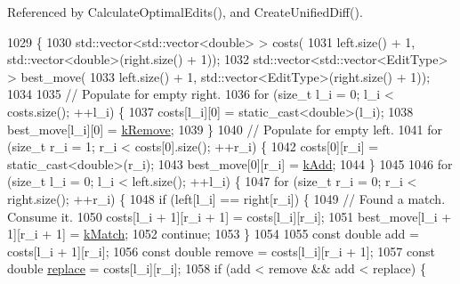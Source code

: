 Referenced by Calculate\+Optimal\+Edits(), and Create\+Unified\+Diff().


\begin{DoxyCode}
1029                                                                             \{
1030   std::vector<std::vector<double> > costs(
1031       left.size() + 1, std::vector<double>(right.size() + 1));
1032   std::vector<std::vector<EditType> > best\_move(
1033       left.size() + 1, std::vector<EditType>(right.size() + 1));
1034 
1035   \textcolor{comment}{// Populate for empty right.}
1036   \textcolor{keywordflow}{for} (\textcolor{keywordtype}{size\_t} l\_i = 0; l\_i < costs.size(); ++l\_i) \{
1037     costs[l\_i][0] = \textcolor{keyword}{static\_cast<}\textcolor{keywordtype}{double}\textcolor{keyword}{>}(l\_i);
1038     best\_move[l\_i][0] = \hyperlink{namespacetesting_1_1internal_1_1edit__distance_ad46aa6da12aec1a3f166310478b53a08a814768ef6cd0264a0a10b1e701a63e78}{kRemove};
1039   \}
1040   \textcolor{comment}{// Populate for empty left.}
1041   \textcolor{keywordflow}{for} (\textcolor{keywordtype}{size\_t} r\_i = 1; r\_i < costs[0].size(); ++r\_i) \{
1042     costs[0][r\_i] = \textcolor{keyword}{static\_cast<}\textcolor{keywordtype}{double}\textcolor{keyword}{>}(r\_i);
1043     best\_move[0][r\_i] = \hyperlink{namespacetesting_1_1internal_1_1edit__distance_ad46aa6da12aec1a3f166310478b53a08a63400b073f5b311a87d568b5ae27ffe8}{kAdd};
1044   \}
1045 
1046   \textcolor{keywordflow}{for} (\textcolor{keywordtype}{size\_t} l\_i = 0; l\_i < left.size(); ++l\_i) \{
1047     \textcolor{keywordflow}{for} (\textcolor{keywordtype}{size\_t} r\_i = 0; r\_i < right.size(); ++r\_i) \{
1048       \textcolor{keywordflow}{if} (left[l\_i] == right[r\_i]) \{
1049         \textcolor{comment}{// Found a match. Consume it.}
1050         costs[l\_i + 1][r\_i + 1] = costs[l\_i][r\_i];
1051         best\_move[l\_i + 1][r\_i + 1] = \hyperlink{namespacetesting_1_1internal_1_1edit__distance_ad46aa6da12aec1a3f166310478b53a08a7bdb9c74613a94f21b7489e0b5640a63}{kMatch};
1052         \textcolor{keywordflow}{continue};
1053       \}
1054 
1055       \textcolor{keyword}{const} \textcolor{keywordtype}{double} add = costs[l\_i + 1][r\_i];
1056       \textcolor{keyword}{const} \textcolor{keywordtype}{double} \textcolor{keyword}{remove} = costs[l\_i][r\_i + 1];
1057       \textcolor{keyword}{const} \textcolor{keywordtype}{double} \hyperlink{namespacesmacc_1_1introspection_a48571b9bf3b115d2a83cc0147c96d0bd}{replace} = costs[l\_i][r\_i];
1058       \textcolor{keywordflow}{if} (add < \textcolor{keyword}{remove} && add < replace) \{

\end{DoxyCode}

